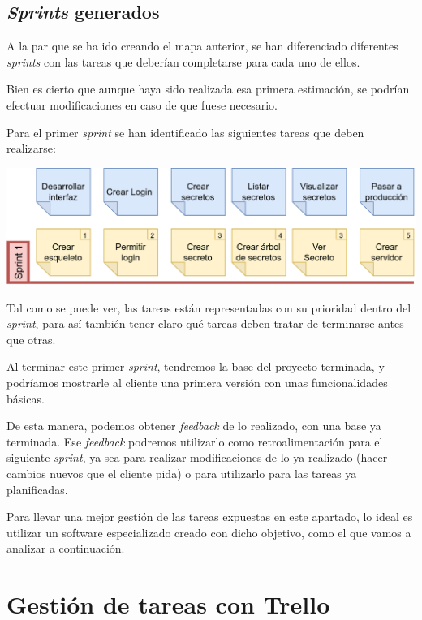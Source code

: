 \documentclass{\ClassPath/viu-tfm-template}
\begin{document}
\subsection{\textit{Sprints} generados}

A la par que se ha ido creando el mapa anterior, se han diferenciado diferentes \textit{sprints} con las tareas que deberían completarse para cada uno de ellos.

Bien es cierto que aunque haya sido realizada esa primera estimación, se podrían efectuar modificaciones en caso de que fuese necesario.

Para el primer \textit{sprint} se han identificado las siguientes tareas que deben realizarse:

\begin{center}
    \includegraphics[width=\linewidth]{img/sprint1.png}
\end{center}

Tal como se puede ver, las tareas están representadas con su prioridad dentro del \textit{sprint}, para así también tener claro qué tareas deben tratar de terminarse antes que otras.

Al terminar este primer \textit{sprint}, tendremos la base del proyecto terminada, y podríamos mostrarle al cliente una primera versión con unas funcionalidades básicas.

De esta manera, podemos obtener \textit{feedback} de lo realizado, con una base ya terminada. Ese \textit{feedback} podremos utilizarlo como retroalimentación para el siguiente \textit{sprint}, ya sea para realizar modificaciones de lo ya realizado (hacer cambios nuevos que el cliente pida) o para utilizarlo para las tareas ya planificadas.

Para llevar una mejor gestión de las tareas expuestas en este apartado, lo ideal es utilizar un software especializado creado con dicho objetivo, como el que vamos a analizar a continuación.

\section{Gestión de tareas con Trello}
\end{document}
